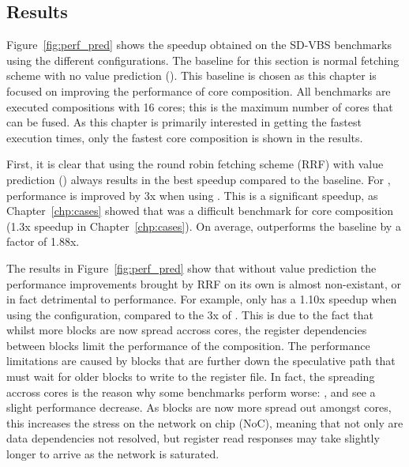 \subsection{Results}
Figure~\ref{fig:perf_pred} shows the speedup obtained on the SD-VBS benchmarks using the different configurations.
The baseline for this section is normal fetching scheme with no value prediction (\novp).
This baseline is chosen as this chapter is focused on improving the performance of core composition.
All benchmarks are executed compositions with 16 cores; this is the maximum number of cores that can be fused.
As this chapter is primarily interested in getting the fastest execution times, only the fastest core composition is shown in the results.

First, it is clear that using the round robin fetching scheme (RRF) with value prediction (\nfvp) always results in the best speedup compared to the baseline.
For , performance is improved by 3x when using \nfvp.
This is a significant speedup, as Chapter~\ref{chp:cases} showed that  was a difficult benchmark for core composition (1.3x speedup in Chapter~\ref{chp:cases}).
On average, \nfvp{} outperforms the baseline by a factor of 1.88x.

The results in Figure~\ref{fig:perf_pred} show that without value prediction the performance improvements brought by RRF on its own is almost non-existant, or in fact detrimental to performance.
For example,  only has a 1.10x speedup when using the \nfnovp{} configuration, compared to the 3x of \nfvp{}.
This is due to the fact that whilst more blocks are now spread accross cores, the register dependencies between blocks limit the performance of the composition. 
The performance limitations are caused by blocks that are further down the speculative path that must wait for older blocks to write to the register file.
In fact, the spreading accross cores is the reason why some benchmarks perform worse: ,  and  see a slight performance decrease.
As blocks are now more spread out amongst cores, this increases the stress on the network on chip (NoC), meaning that not only are data dependencies not resolved, but register read responses may take slightly longer to arrive as the network is saturated.

